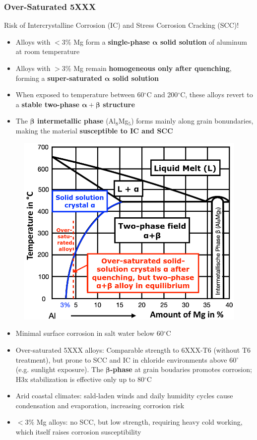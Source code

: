 \documentclass{article}
\begin{document}
\subsubsection{Over-Saturated 5XXX}
Risk of Intercrystalline Corrosion (IC) and Stress Corrosion Cracking (SCC)!
\begin{itemize}
  \item Alloys with $<3$\% Mg form a \textbf{single-phase $\bm{\alpha}$ solid solution} of aluminum at room temperature
  \item Alloys with $>3$\% Mg remain \textbf{homogeneous only after quenching}, forming a \textbf{super-saturated $\bm{\alpha}$ solid solution}
  \item When exposed to temperature between 60$^\circ$C and 200$^\circ$C, these alloys revert to a \textbf{stable two-phase $\bm{\alpha + \beta}$ structure}
  \item The \textbf{$\bm{\beta}$ intermetallic phase} (Al$_8$Mg$_5$) forms mainly along grain bonundaries, making the material \textbf{susceptible to IC and SCC}
\end{itemize}

\begin{figure}[ht!]
  \centering
  \includegraphics[width=.5\textwidth]{media/over-saturated_al.png}
\end{figure}

\begin{itemize}
  \item Minimal surface corrosion in salt water below 60$^\circ$C
  \item Over-saturated 5XXX alloys: Comparable strength to 6XXX-T6 (without T6 treatment), but prone to SCC and IC in chloride environments above 60$^\circ$ (e.g. sunlight exposure). The $\bm{\beta}$\textbf{-phase} at grain boudaries promotes corrosion; H3x stabilization is effective only up to 80$^\circ$C
  \item Arid coastal climates: sald-laden winds and daily humidity cycles cause condensation and evaporation, increasing corrosion risk
  \item $<$3\% Mg alloys: no SCC, but low strength, requiring heavy cold working, which itself raises corrosion susceptibility
\end{itemize}
\end{document}
